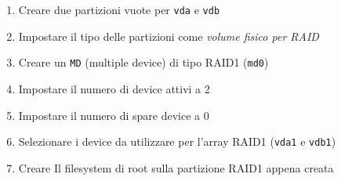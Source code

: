 \documentclass[11pt]{article}
\begin{document}
\begin{enumerate}
    \item Creare due partizioni vuote per \texttt{vda} e \texttt{vdb}
    \item Impostare il tipo delle partizioni come \textit{volume fisico per RAID}
    \item Creare un \texttt{MD} (multiple device) di tipo RAID1 (\texttt{md0})
    \item Impostare il numero di device attivi a 2
    \item Impostare il numero di spare device a 0
    \item Selezionare i device da utilizzare per l'array RAID1 (\texttt{vda1} e \texttt{vdb1})
    \item Creare Il filesystem di root sulla partizione RAID1 appena creata
\end{enumerate}
\end{document}
